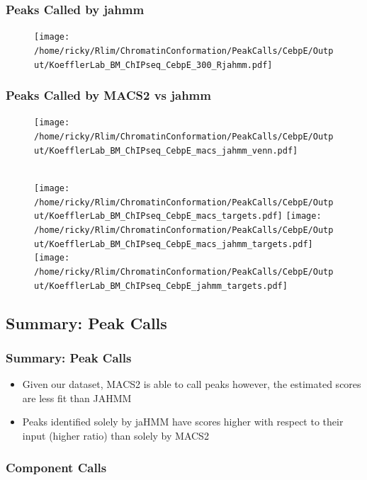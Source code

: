 \documentclass[notes]{beamer}
\begin{document}
\begin{frame}[plain]
    \frametitle{Peaks Called by jahmm}
    \begin{figure}
        \texttt{[image: /home/ricky/Rlim/ChromatinConformation/PeakCalls/CebpE/Output/KoefflerLab\_BM\_ChIPseq\_CebpE\_300\_Rjahmm.pdf]}
    \end{figure}
\end{frame}

\begin{frame}[plain]
    \frametitle{Peaks Called by MACS2 vs jahmm}
    \begin{figure}                           
        \begin{center}
            \texttt{[image: /home/ricky/Rlim/ChromatinConformation/PeakCalls/CebpE/Output/KoefflerLab\_BM\_ChIPseq\_CebpE\_macs\_jahmm\_venn.pdf]}
        \end{center}
        \\
        \texttt{[image: /home/ricky/Rlim/ChromatinConformation/PeakCalls/CebpE/Output/KoefflerLab\_BM\_ChIPseq\_CebpE\_macs\_targets.pdf]}
        \texttt{[image: /home/ricky/Rlim/ChromatinConformation/PeakCalls/CebpE/Output/KoefflerLab\_BM\_ChIPseq\_CebpE\_macs\_jahmm\_targets.pdf]}
        \texttt{[image: /home/ricky/Rlim/ChromatinConformation/PeakCalls/CebpE/Output/KoefflerLab\_BM\_ChIPseq\_CebpE\_jahmm\_targets.pdf]}
    \end{figure}
\end{frame}

\subsection{Summary: Peak Calls}
\begin{frame}
    \frametitle{Summary: Peak Calls}
    \begin{itemize}[<+->]
        \item Given our dataset, MACS2 is able to call peaks however, the estimated scores are less fit than JAHMM 
        \item Peaks identified solely by jaHMM have scores higher with respect to their input (higher ratio) than solely by MACS2  
    \end{itemize}
\end{frame}

\subsubsection{Component Calls}
\begin{frame}

\end{frame}
\end{document}
